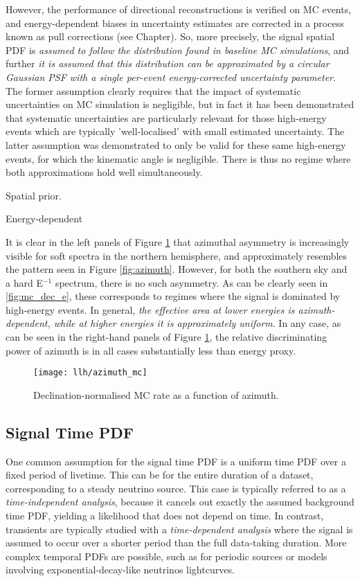 However, the performance of directional reconstructions is verified on MC events, and energy-dependent biases in uncertainty estimates are corrected in a process known as pull corrections (see Chapter). So, more precisely, the signal spatial PDF is \emph{assumed to follow the distribution found in baseline MC simulations}, and further \emph{it is assumed that this distribution can be approximated by a circular Gaussian PSF with a single per-event energy-corrected uncertainty parameter}. The former assumption clearly requires that the impact of systematic uncertainties on MC simulation is negligible, but in fact it has been demonstrated that systematic uncertainties are particularly relevant for those high-energy events which are typically 'well-localised' with small estimated uncertainty. The latter assumption was demonstrated to only be valid for these same high-energy events, for which the kinematic angle is negligible. There is thus no regime where both approximations hold well simultaneously.

Spatial prior.

Energy-dependent

It is clear in the left panels of Figure \ref{fig:azimuth_mc} that azimuthal asymmetry is increasingly visible for soft spectra in the northern hemisphere, and approximately  resembles the pattern seen in Figure \ref{fig:azimuth}. However, for both the southern sky and a hard E$^{-1}$ spectrum, there is no such asymmetry. As can be clearly seen in \ref{fig:mc_dec_e}, these corresponds to regimes where the signal is dominated by high-energy events. In general, \emph{the effective area at lower energies is azimuth-dependent, while at higher energies it is approximately uniform}. In any case, as can be seen in the right-hand panels of Figure \ref{fig:azimuth_mc}, the relative discriminating power of azimuth is in all cases substantially less than energy proxy.

\begin{figure}[!ht]
	\centering \texttt{[image: llh/azimuth\_mc]}
	\caption{Declination-normalised MC rate as a function of azimuth.}
	\label{fig:azimuth_mc}
\end{figure}

\subsection{Signal Time PDF}

One common assumption for the signal time PDF is a uniform time PDF over a fixed period of livetime. This can be for the entire duration of a dataset, corresponding to a steady neutrino source. This case is typically referred to as a \emph{time-independent analysis}, because it cancels out exactly the assumed background time PDF, yielding a likelihood that does not depend on time. In contrast, transients are typically studied with a \emph{time-dependent analysis} where the signal is assumed to occur over a shorter period than the full data-taking duration. More complex temporal PDFs are possible, such as for periodic sources or models involving exponential-decay-like neutrinos lightcurves.

